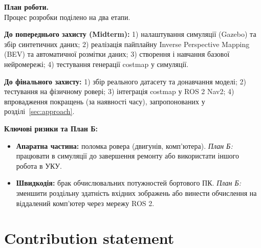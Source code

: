 \documentclass[ukrainian]{ucuproposal}
\begin{document}
\textbf{План роботи.} \\
Процес розробки поділено на два етапи.

\textbf{До попереднього захисту (Midterm):} 1) налаштування симуляції (Gazebo) та збір синтетичних даних; 2) реалізація пайплайну Inverse Perspective Mapping (BEV) та автоматичної розмітки даних; 3) створення і навчання базової нейромережі; 4) тестування генерації costmap у симуляції.

\textbf{До фінального захисту:} 1) збір реального датасету та донавчання моделі; 2) тестування на фізичному ровері; 3) інтеграція costmap у ROS 2 Nav2; 4) впровадження покращень (за наявності часу), запропонованих у розділі~\autoref{sec:approach}.

\textbf{Ключові ризики та План Б:}
\begin{itemize}
	\item \textbf{Апаратна частина:} поломка ровера (двигунів, комп'ютера). \textit{План Б:} працювати в симуляції до завершення ремонту або використати іншого робота в УКУ.
	\item \textbf{Швидкодія:} брак обчислювальних потужностей бортового ПК. \textit{План Б:} зменшити роздільну здатність вхідних зображень або винести обчислення на віддалений комп'ютер через мережу ROS 2.
\end{itemize}

\section{Contribution statement}
\begin{contributions}


\end{contributions}


\ucuprintbibliography
\end{document}
